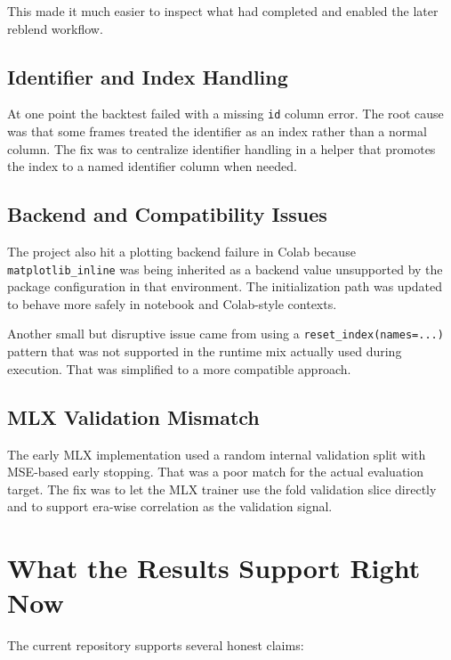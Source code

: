 \documentclass[11pt]{article}
\begin{document}
This made it much easier to inspect what had completed and enabled the later reblend workflow.

\subsection{Identifier and Index Handling}

At one point the backtest failed with a missing \texttt{id} column error. The root cause was that some frames treated the identifier as an index rather than a normal column. The fix was to centralize identifier handling in a helper that promotes the index to a named identifier column when needed.

\subsection{Backend and Compatibility Issues}

The project also hit a plotting backend failure in Colab because \texttt{matplotlib\_inline} was being inherited as a backend value unsupported by the package configuration in that environment. The initialization path was updated to behave more safely in notebook and Colab-style contexts.

Another small but disruptive issue came from using a \texttt{reset\_index(names=...)} pattern that was not supported in the runtime mix actually used during execution. That was simplified to a more compatible approach.

\subsection{MLX Validation Mismatch}

The early MLX implementation used a random internal validation split with MSE-based early stopping. That was a poor match for the actual evaluation target. The fix was to let the MLX trainer use the fold validation slice directly and to support era-wise correlation as the validation signal.

\section{What the Results Support Right Now}

The current repository supports several honest claims:
\end{document}
